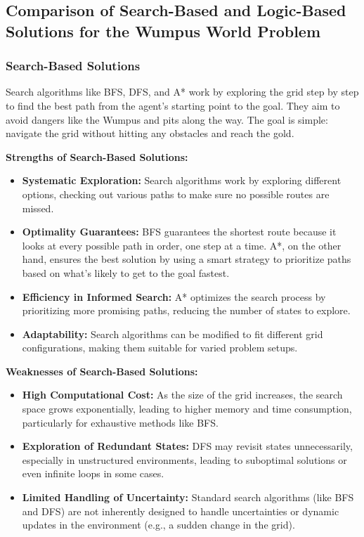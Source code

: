 \documentclass[12pt]{article}
\begin{document}
\subsection{Comparison of Search-Based and Logic-Based Solutions for the Wumpus World Problem}

\subsubsection{Search-Based Solutions}
Search algorithms like BFS, DFS, and A* work by exploring the grid step by step to find the best path from the agent's starting point to the goal. They aim to avoid dangers like the Wumpus and pits along the way. The goal is simple: navigate the grid without hitting any obstacles and reach the gold.

\textbf{Strengths of Search-Based Solutions:}
\begin{itemize}
    \item \textbf{Systematic Exploration:} Search algorithms work by exploring different options, checking out various paths to make sure no possible routes are missed.
    \item \textbf{Optimality Guarantees:} BFS guarantees the shortest route because it looks at every possible path in order, one step at a time. A*, on the other hand, ensures the best solution by using a smart strategy to prioritize paths based on what’s likely to get to the goal fastest.
    \item \textbf{Efficiency in Informed Search:} A* optimizes the search process by prioritizing more promising paths, reducing the number of states to explore.
    \item \textbf{Adaptability:} Search algorithms can be modified to fit different grid configurations, making them suitable for varied problem setups.
\end{itemize}

\textbf{Weaknesses of Search-Based Solutions:}
\begin{itemize}
    \item \textbf{High Computational Cost:} As the size of the grid increases, the search space grows exponentially, leading to higher memory and time consumption, particularly for exhaustive methods like BFS.
    \item \textbf{Exploration of Redundant States:} DFS may revisit states unnecessarily, especially in unstructured environments, leading to suboptimal solutions or even infinite loops in some cases.
    \item \textbf{Limited Handling of Uncertainty:} Standard search algorithms (like BFS and DFS) are not inherently designed to handle uncertainties or dynamic updates in the environment (e.g., a sudden change in the grid).
\end{itemize}
\end{document}
